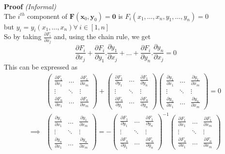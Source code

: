 \documentclass[11pt,a4paper]{article}
\begin{document}
\textbf{Proof} \textit{(Informal)}\\
The $i^{th}$ component of $\textbf{F}(\textbf{x}_0, \textbf{y}_0) = \textbf{0}$ is $F_i(x_1, \dots, x_n, y_1, \dots, y_n) = 0$\\
but $y_i=y_i(x_1, \dots, x_n) \forall\ i \in [1, n]$\\
So by taking $\frac{\partial F_i}{\partial x_j}$ and, using the chain rule, we get
$$\frac{\partial F_i}{\partial x_j} + \frac{\partial F_i}{\partial y_1}.\frac{\partial y_1}{\partial x_j} + \dots +\frac{\partial F_i}{\partial y_n}.\frac{\partial y_n}{\partial x_j}=0$$
This can be expressed as
\[\begin{array}{rl}
&\begin{pmatrix}
\frac{\partial F_1}{\partial x_1} & \dots & \frac{\partial F_1}{\partial x_m}\\
\vdots & \ddots & \vdots\\
\frac{\partial F_n}{\partial x_1} & \dots & \frac{\partial F_n}{\partial x_m}
\end{pmatrix} +\begin{pmatrix}
\frac{\partial F_1}{\partial y_1} & \dots & \frac{\partial F_1}{\partial y_n}\\
\vdots & \ddots & \vdots\\
\frac{\partial F_n}{\partial y_1} & \dots & \frac{\partial F_n}{\partial y_n}
\end{pmatrix} \begin{pmatrix}
\frac{\partial y_1}{\partial x_1} & \dots & \frac{\partial y_1}{\partial x_m}\\
\vdots & \ddots & \vdots\\
\frac{\partial y_n}{\partial x_1} & \dots & \frac{\partial y_n}{\partial x_m}
\end{pmatrix} = 0 \\
\implies& \begin{pmatrix}
\frac{\partial y_1}{\partial x_1} & \dots & \frac{\partial y_1}{\partial x_m}\\
\vdots & \ddots & \vdots\\
\frac{\partial y_n}{\partial x_1} & \dots & \frac{\partial y_n}{\partial x_m}
\end{pmatrix} = - \begin{pmatrix}
\frac{\partial F_1}{\partial y_1} & \dots & \frac{\partial F_1}{\partial y_n}\\
\vdots & \ddots & \vdots\\
\frac{\partial F_n}{\partial y_1} & \dots & \frac{\partial F_n}{\partial y_n}
\end{pmatrix}^{-1} \begin{pmatrix}
\frac{\partial F_1}{\partial x_1} & \dots & \frac{\partial F_1}{\partial x_m}\\
\vdots & \ddots & \vdots\\
\frac{\partial F_n}{\partial x_1} & \dots & \frac{\partial F_n}{\partial x_m}
\end{pmatrix}
\end{array}\]
\end{document}
